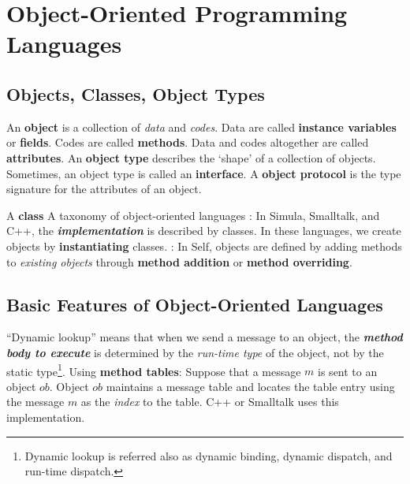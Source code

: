 \documentclass{article}
\begin{document}
\section{Object-Oriented Programming Languages}
\subsection{Objects, Classes, Object Types}
\bit
\w An {\bf{}object} is a collection of {\em{}data\/} and {\em{}codes\/}.
	\bit
	\w Data are called {\bf{}instance variables} or {\bf{}fields}.
	\w Codes are called {\bf{}methods}.
	\w Data and codes altogether are called {\bf{}attributes}.
	\eit
\w An {\bf{}object type} describes the `shape' of a collection of objects.
	\bit
	\w Sometimes, an object type is called an {\bf{}interface}.
	\w A {\bf{}object protocol} is the type signature for the
		attributes of an object.
	\eit

\w A {\bf{}class} 
\w A taxonomy of object-oriented languages
	\bit
	: In Simula, Smalltalk, and C++,
		the {\sl\bfseries{}implementation\/} is described by
		classes. In these languages, we create objects by
		{\bf{}instantiating} classes.
	: In Self, objects are
		defined by adding methods to {\em{}existing objects\/}
		through {\bf{}method addition} or {\bf{}method 
		overriding}.
	\eit
\eit

\subsection{Basic Features of Object-Oriented Languages}
\bit
{}
	\bit
	\w ``Dynamic lookup'' means that when we send a message to
		an object, the {\sl\bfseries{}method body to execute\/}
		is determined
		by the {\em{}run-time type\/} of the object, not by
		the static type\footnote{Dynamic lookup is referred 
		also as dynamic binding, dynamic dispatch, 
		and run-time dispatch\/.}.
		\ben
		\w [(a)] Using {\bf{}method tables}: Suppose that a message $m$
			is sent to an object $ob$. Object $ob$ maintains 
			a message table and locates the table entry 
			using the message $m$ as the {\em{}index\/} to the
			table. C++ or Smalltalk uses this implementation.
			\vspace{0.1cm}
\end{document}
